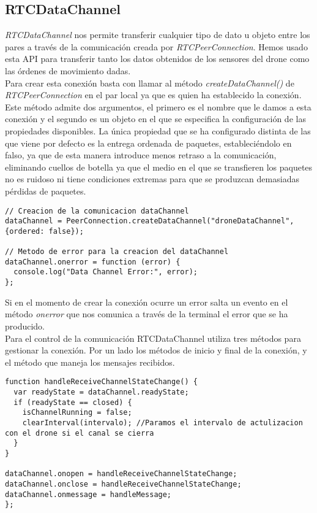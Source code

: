 \subsection{RTCDataChannel}

\emph{RTCDataChannel} nos permite transferir cualquier tipo de dato u objeto entre los pares a través de la comunicación creada por \emph{RTCPeerConnection}. Hemos usado esta API para transferir tanto los datos obtenidos de los sensores del drone como las órdenes de movimiento dadas.\\

Para crear esta conexión basta con llamar al método \emph{createDataChannel()} de \emph{RTCPeerConnection} en el par local ya que es quien ha establecido la conexión. Este método admite dos argumentos, el primero es el nombre que le damos a esta conexión y el segundo es un objeto en el que se especifica la configuración de las propiedades disponibles. La única propiedad que se ha configurado distinta de las que viene por defecto es la entrega ordenada de paquetes, estableciéndolo en falso, ya que de esta manera introduce menos retraso a la comunicación, eliminando cuellos de botella ya que el medio en el que se transfieren los paquetes no es ruidoso ni tiene condiciones extremas para que se produzcan demasiadas pérdidas de paquetes.\\

\begin{lstlisting}[caption=Establecimiento conexión RTCDataChannel en el par local.]
// Creacion de la comunicacion dataChannel
dataChannel = PeerConnection.createDataChannel("droneDataChannel", {ordered: false});

// Metodo de error para la creacion del dataChannel
dataChannel.onerror = function (error) {
  console.log("Data Channel Error:", error);
};\end{lstlisting}

Si en el momento de crear la conexión ocurre un error salta un evento en el método \emph{onerror} que nos comunica a través de la terminal el error que se ha producido.\\

Para el control de la comunicación RTCDataChannel utiliza tres métodos para gestionar la conexión. Por un lado los métodos de inicio y final de la conexión, y el método que maneja los mensajes recibidos.\\

\begin{lstlisting}[caption={Manejadores de RTCdataChannel.}, label={lst:manejadoresdatachannel}]
function handleReceiveChannelStateChange() {
  var readyState = dataChannel.readyState;
  if (readyState == closed) {
    isChannelRunning = false;
    clearInterval(intervalo); //Paramos el intervalo de actulizacion con el drone si el canal se cierra
  }
}

dataChannel.onopen = handleReceiveChannelStateChange;
dataChannel.onclose = handleReceiveChannelStateChange;
dataChannel.onmessage = handleMessage;
};\end{lstlisting}

